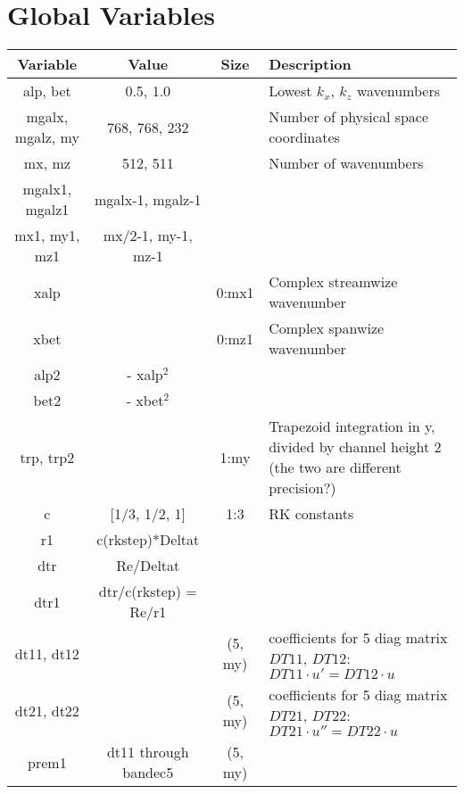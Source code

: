 \documentclass[titlepage,12pt,letter]{article}
\numberwithin{equation}{section}
\begin{document}
\newpage


\section{Global Variables}
\begin{table}[H]
	\centering 
	\renewcommand{\arraystretch}{1.5} 
	\begin{tabular}{c|c|c|m{8cm}}
		Variable&Value&Size&Description \\ \hline
		alp, bet& 0.5, 1.0&& Lowest $k_x$, $k_z$ wavenumbers\\ \hline
		mgalx, mgalz, my& 768, 768, 232&& Number of physical space coordinates \\
		mx, mz& 512, 511&& Number of wavenumbers\\ \hdashline
		mgalx1, mgalz1& mgalx-1, mgalz-1&&\\
		mx1, my1, mz1&mx/2-1, my-1, mz-1&&\\ \hline
		xalp&	&0:mx1	&Complex streamwize wavenumber\\			
		xbet&	&0:mz1	&Complex spanwize wavenumber\\		\hline
		alp2& - xalp$^2$ &&\\
		bet2& - xbet$^2$ &&\\ \hline
		trp, trp2&	&1:my&Trapezoid integration in y, divided by channel height 2 (the two are different precision?)\\ \hline
		c & [1/3, 1/2, 1]&1:3& RK constants \\
		r1& c(rkstep)*Deltat& &\\
		dtr& Re/Deltat& & \\
		dtr1& dtr/c(rkstep) = Re/r1 & & \\ \hline		
		dt11, dt12&&(5, my)&coefficients for 5 diag matrix $DT11$, $DT12$:	$DT11\cdot u' = DT12\cdot u$ \\
		dt21, dt22&&(5, my)&coefficients for 5 diag matrix $DT21$, $DT22$: $DT21\cdot u'' = DT22\cdot u$ \\ 
		prem1& dt11 through bandec5&(5, my) &\\\hline
		
	\end{tabular} 
\end{table} 
\end{document}
